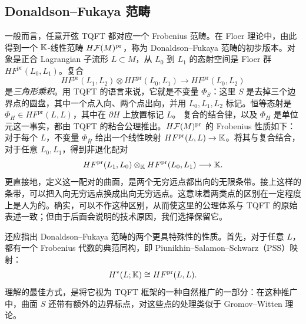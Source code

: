 \subsection{Donaldson–Fukaya 范畴}\label{sec:8c}
一般而言，任意开弦 TQFT 都对应一个 Frobenius 范畴。在 Floer 理论中，由此得到一个 $\mathbb K$-线性范畴 $H\mathcal F(M)^{\mathrm{pr}}$，称为 Donaldson–Fukaya 范畴的初步版本。对象是正合 Lagrangian 子流形 $L\subset M$，从 $L_0$ 到 $L_1$ 的态射空间是 Floer 群 $HF^{\mathrm{pr}}(L_0,L_1)$。复合
\begin{equation}\label{eq:8.3}
HF^{\mathrm{pr}}(L_1,L_2)\otimes HF^{\mathrm{pr}}(L_0,L_1)\longrightarrow HF^{\mathrm{pr}}(L_0,L_2)
\end{equation}
是\emph{三角形乘积}。用 TQFT 的语言来说，它就是不变量 $\Phi_S$：这里 $S$ 是去掉三个边界点的圆盘，其中一个点入向、两个点出向，并用 $L_0,L_1,L_2$ 标记。恒等态射是 $\Phi_H\in HF^{\mathrm{pr}}(L,L)$，其中在 $\partial H$ 上放置标记 $L$。
复合的结合律，以及 $\Phi_H$ 是单位元这一事实，都由 TQFT 的粘合公理推出。$H\mathcal F(M)^{\mathrm{pr}}$ 的 Frobenius 性质如下：对于每个 $L$，不变量 $\Phi_{\overline H}$ 给出一个线性映射 $HF^{\mathrm{pr}}(L,L)\to\mathbb K$。将其与复合结合，对于任意 $L_0,L_1$，得到非退化配对
\[
HF^{\mathrm{pr}}(L_1,L_0)\otimes_{\mathbb K}HF^{\mathrm{pr}}(L_0,L_1)\longrightarrow\mathbb K.
\]
更直接地，定义这一配对的曲面，是两个无穷远点都出向的无限条带。接上这样的条带，可以把入向无穷远点换成出向无穷远点。这意味着两类点的区别在一定程度上是人为的。确实，可以不作这种区别，从而使这里的公理体系与 TQFT 的原始表述一致；但由于后面会说明的技术原因，我们选择保留它。

还应指出 Donaldson–Fukaya 范畴的两个更具特殊性的性质。首先，对于任意 $L$，都有一个 Frobenius 代数的典范同构，即 Piunikhin–Salamon–Schwarz（PSS）映射：
\begin{equation}\label{eq:8.4}
H^*(L;\mathbb K)\cong HF^{\mathrm{pr}}(L,L).
\end{equation}
理解的最佳方式，是将它视为 TQFT 框架的一种自然推广的一部分：在这种推广中，曲面 $S$ 还带有额外的边界标点，对这些点的处理类似于 Gromov–Witten 理论。

